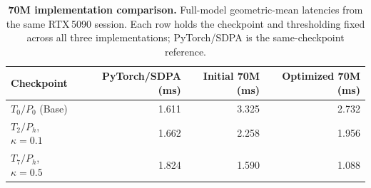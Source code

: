 \begin{table}[!htbp]
\centering\small
\caption{\textbf{70M implementation comparison.} Full-model geometric-mean latencies from the same RTX\,5090 session. Each row holds the checkpoint and thresholding fixed across all three implementations; PyTorch/SDPA is the same-checkpoint reference.}
\label{tab:70m-kernel-transfer}
\begin{tabular}{@{}lrrr@{}}
\toprule
Checkpoint & PyTorch/SDPA (ms) & Initial 70M (ms) & Optimized 70M (ms) \\
\midrule
$T_{0}/P_{0}$ (Base) & 1.611 & 3.325 & 2.732 \\
$T_{2}/P_{h}$, $\kappa=0.1$ & 1.662 & 2.258 & 1.956 \\
$T_{7}/P_{h}$, $\kappa=0.5$ & 1.824 & 1.590 & 1.088 \\
\bottomrule
\end{tabular}
\end{table}
